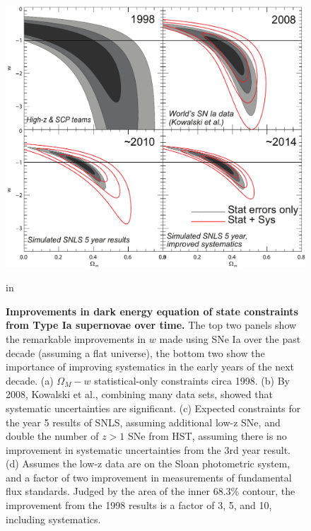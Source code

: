\documentclass{nature1}
\begin{document}
\begin{figure}
\includegraphics[width=7in]{wplots4c.pdf} 
\caption{\textsf{ {\bf\textsf{Improvements in dark energy equation of state
    constraints from Type Ia supernovae over time.}}  The top two
  panels show the remarkable improvements in $w$ made using SNe Ia
  over the past decade (assuming a flat universe), the bottom two show
  the importance of improving systematics in the early years of the
  next decade\citep{2009arXiv0903.1086H}.  (a) $\Omega_M - w$
  statistical-only constraints circa 1998\citep{1998ApJ...493L..53G}.
  (b) By 2008, Kowalski et al., combining many data sets, showed
  that systematic uncertainties are
  significant\citep{2008ApJ...686..749K}. (c) Expected
  constraints for the year 5 results of SNLS, assuming additional
  low-z SNe, and double the number of $z > 1$ SNe from HST, assuming
  there is no improvement in systematic uncertainties from the 3rd
  year result.  (d) Assumes the low-z data are on the
  Sloan photometric system, and a factor of two improvement in
  measurements of fundamental flux standards.  Judged by the area of
  the inner 68.3\% contour, the improvement from the 1998 results is a
  factor of 3, 5, and 10, including systematics.}}
\label{wplot}
 in
\end{figure}
\end{document}
